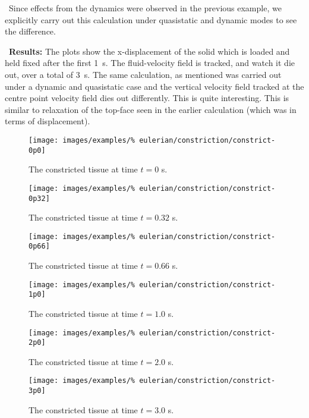 \textbullet\ Since effects from the dynamics were observed in the
previous example, we explicitly carry out this calculation under
quasistatic and dynamic modes to see the difference.

\textbullet\ {\bf Results:} The plots show the x-displacement of the
solid which is loaded and held fixed after the first 1~s. The
fluid-velocity field is tracked, and watch it die out, over a total of
3~s. The same calculation, as mentioned was carried out under a
dynamic and quasistatic case and the vertical velocity field tracked
at the centre point velocity field dies out differently. This is quite
interesting. This is similar to relaxation of the top-face seen in the
earlier calculation (which was in terms of displacement).

\begin{figure}[!hptb]
\centering
\texttt{[image: images/examples/\%
eulerian/constriction/constrict-0p0]}
\caption{The constricted tissue at time $t=0$ s.} 
\label{constrict-image-0p0}
\end{figure}

\begin{figure}[!hptb]
\centering
\texttt{[image: images/examples/\%
eulerian/constriction/constrict-0p32]}
\caption{The constricted tissue at time $t=0.32$ s.} 
\label{constrict-image-0p32}
\end{figure}

\begin{figure}[!hptb]
\centering
\texttt{[image: images/examples/\%
eulerian/constriction/constrict-0p66]}
\caption{The constricted tissue at time $t=0.66$ s.} 
\label{constrict-image-0p66}
\end{figure}

\begin{figure}[!hptb]
\centering
\texttt{[image: images/examples/\%
eulerian/constriction/constrict-1p0]}
\caption{The constricted tissue at time $t=1.0$ s.} 
\label{constrict-image-1p0}
\end{figure}

\begin{figure}[!hptb]
\centering
\texttt{[image: images/examples/\%
eulerian/constriction/constrict-2p0]}
\caption{The constricted tissue at time $t=2.0$ s.} 
\label{constrict-image-2p0}
\end{figure}

\begin{figure}[!hptb]
\centering
\texttt{[image: images/examples/\%
eulerian/constriction/constrict-3p0]}
\caption{The constricted tissue at time $t=3.0$ s.} 
\label{constrict-image-3p0}
\end{figure}

